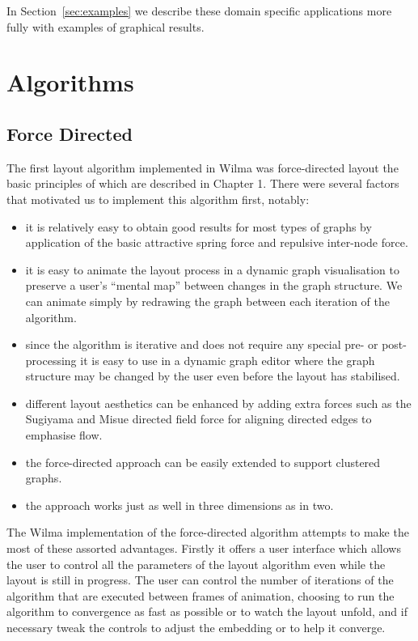 \documentclass[runningheads]{cl2emult}
\begin{document}
In
Section~\ref{sec:examples} we describe these domain specific
applications more fully with examples of graphical results.


\section{Algorithms} \label{sec:algorithms}
\subsection{Force Directed} \label{sec:forcedirectedlayout}
The first layout algorithm implemented in Wilma was force-directed
layout the basic principles of which are described in Chapter
1.  There were several factors that motivated us to
implement this algorithm first, notably:
\begin{itemize}
\item it is relatively easy to obtain good results for most types of
graphs by application of the basic attractive spring force and
repulsive inter-node force.
\item it is easy to animate the layout process in a dynamic
graph visualisation to preserve a user's ``mental map''\cite{Misue:VLC95}
between changes in the graph structure.  We can animate simply by
redrawing the graph between each iteration of the algorithm.
\item since the algorithm is iterative and does not require any
special pre- or post-processing it is easy to use in a dynamic graph
editor where the graph structure may be changed by the user even
before the layout has stabilised.
\item different layout
aesthetics can be enhanced by adding extra forces such as the Sugiyama and Misue\cite{Sugiyama:VLC95}
directed field force for aligning directed edges to emphasise flow.
\item the force-directed approach can be easily extended to support
clustered graphs\cite{Huang:GD98}.
\item the approach works just as well in three dimensions as in two.
\end{itemize}
The Wilma implementation of the force-directed algorithm attempts to make the most
of these assorted advantages.  Firstly it offers a user interface which
allows the user to control all the parameters of the layout algorithm
even while the layout is still in progress.  The user can control the
number of iterations of the algorithm that are executed between frames
of animation, choosing to run the algorithm to
convergence as fast as possible or to watch the layout unfold, and if
necessary tweak the controls to adjust the embedding or to help it
converge.
\end{document}
